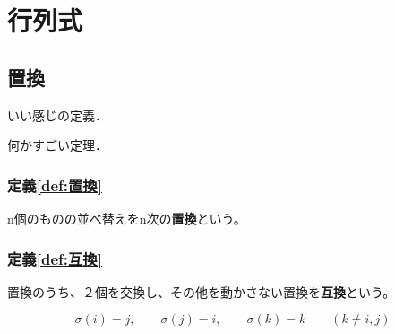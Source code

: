 \chapter{行列式}
\section{置換}

\begin{dfn}
  いい感じの定義．
  \end{dfn}
  \begin{thm}
  何かすごい定理．
  \end{thm}

\subsection*{定義\ref{def:置換}}\label{def:置換}
n個のものの並べ替えをn次の\textbf{置換}という。

\subsection*{定義\ref{def:互換}}\label{def:互換}
置換のうち、２個を交換し、その他を動かさない置換を\textbf{互換}という。



\begin{equation}
  \sigma(i)=j, \qquad \sigma(j)=i, \qquad \sigma(k)=k \qquad (k\neq i,j)
\end{equation}

